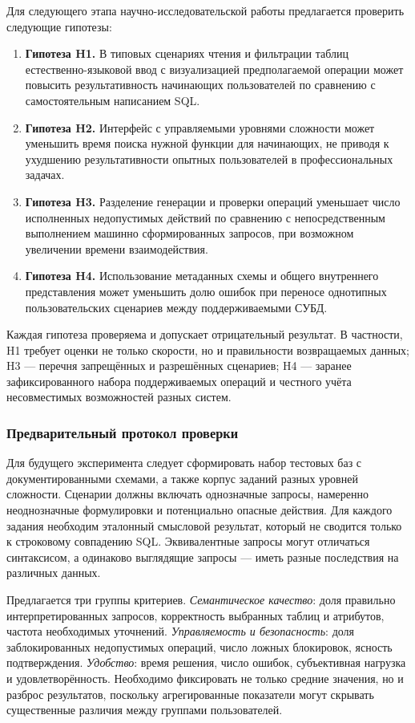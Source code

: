 Для следующего этапа научно-исследовательской работы предлагается проверить следующие гипотезы:
\begin{enumerate}
\item \textbf{Гипотеза H1.} В типовых сценариях чтения и фильтрации таблиц естественно-языковой ввод с визуализацией предполагаемой операции может повысить результативность начинающих пользователей по сравнению с самостоятельным написанием SQL.
\item \textbf{Гипотеза H2.} Интерфейс с управляемыми уровнями сложности может уменьшить время поиска нужной функции для начинающих, не приводя к ухудшению результативности опытных пользователей в профессиональных задачах.
\item \textbf{Гипотеза H3.} Разделение генерации и проверки операций уменьшает число исполненных недопустимых действий по сравнению с непосредственным выполнением машинно сформированных запросов, при возможном увеличении времени взаимодействия.
\item \textbf{Гипотеза H4.} Использование метаданных схемы и общего внутреннего представления может уменьшить долю ошибок при переносе однотипных пользовательских сценариев между поддерживаемыми СУБД.
\end{enumerate}

Каждая гипотеза проверяема и допускает отрицательный результат. В частности, H1 требует оценки не только скорости, но и правильности возвращаемых данных; H3 — перечня запрещённых и разрешённых сценариев; H4 — заранее зафиксированного набора поддерживаемых операций и честного учёта несовместимых возможностей разных систем.

\subsubsection{Предварительный протокол проверки}

Для будущего эксперимента следует сформировать набор тестовых баз с документированными схемами, а также корпус заданий разных уровней сложности. Сценарии должны включать однозначные запросы, намеренно неоднозначные формулировки и потенциально опасные действия. Для каждого задания необходим эталонный смысловой результат, который не сводится только к строковому совпадению SQL. Эквивалентные запросы могут отличаться синтаксисом, а одинаково выглядящие запросы — иметь разные последствия на различных данных.

Предлагается три группы критериев. \emph{Семантическое качество}: доля правильно интерпретированных запросов, корректность выбранных таблиц и атрибутов, частота необходимых уточнений. \emph{Управляемость и безопасность}: доля заблокированных недопустимых операций, число ложных блокировок, ясность подтверждения. \emph{Удобство}: время решения, число ошибок, субъективная нагрузка и удовлетворённость. Необходимо фиксировать не только средние значения, но и разброс результатов, поскольку агрегированные показатели могут скрывать существенные различия между группами пользователей.


